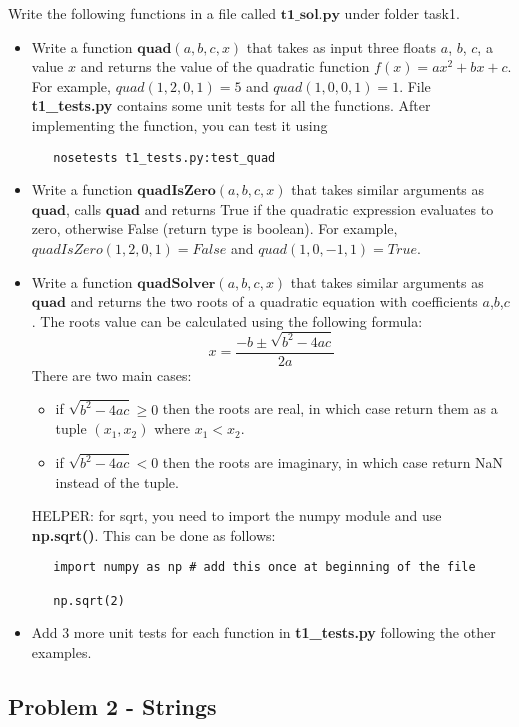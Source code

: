 \documentclass[11pt,a4paper]{report}
\begin{document}
Write the following functions in a file called $\textbf{t1\_sol.py}$ under folder task1.
\begin{itemize}
 \item Write a function $\textbf{quad}(a, b, c, x)$ that takes as input three floats $a$, $b$, $c$, a value $x$ and returns the value of the quadratic function $f(x) = ax^2 +bx +c$. For example, $quad(1,2,0,1) = 5$ and $quad(1,0,0,1) = 1$. File \textbf{t1\_tests.py} contains some unit tests for all the functions. After implementing the function, you can test it using 
  \begin{lstlisting}
   nosetests t1_tests.py:test_quad
  \end{lstlisting}
 \item Write a function $\textbf{quadIsZero}(a, b, c, x)$ that takes similar arguments as $\textbf{quad}$, calls $\textbf{quad}$ and returns True if the quadratic expression evaluates to zero, otherwise False (return type is boolean). For example, $quadIsZero(1,2,0,1) = False$ and $quad(1,0,-1,1) = True$. 
 \item Write a function $\textbf{quadSolver}(a, b, c, x)$ that takes similar arguments as $\textbf{quad}$ and returns the two roots of a quadratic equation with coefficients $a$,$b$,$c$. The roots value can be calculated using the following formula:
 $$ x = \frac{-b \pm \sqrt{b^2 - 4ac}}{2a}$$
 There are two main cases:
 \begin{itemize}
  \item if $\sqrt{b^2 - 4ac} \ge 0 $ then the roots are real, in which case return them as a tuple $(x_1,x_2)$ where $x_1 < x_2$. 
  \item if $\sqrt{b^2 - 4ac} < 0 $ then the roots are imaginary, in which case return NaN instead of the tuple.
 \end{itemize}
 HELPER: for sqrt, you need to import the numpy module and use \textbf{np.sqrt()}. This can be done as follows:
   \begin{lstlisting}
   import numpy as np # add this once at beginning of the file
   
   np.sqrt(2)
  \end{lstlisting}
 \item Add 3 more unit tests for each function in \textbf{t1\_tests.py} following the other examples.
\end{itemize}

\subsection*{Problem 2 - Strings}
\end{document}
